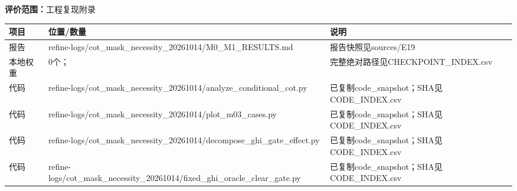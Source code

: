 \documentclass[UTF8,a4paper,landscape,10pt]{ctexart}
\begin{document}
\par
{\small\color{muted}\textbf{评价范围：}工程复现附录}\par\vspace{3mm}
\begin{center}\small
\begin{adjustbox}{max totalheight=0.58\textheight,max width=\linewidth}
\begin{minipage}{\linewidth}\begin{tabularx}{\linewidth}{>{\hsize=0.3500\hsize\raggedright\arraybackslash}X>{\hsize=1.9000\hsize\raggedright\arraybackslash}X>{\hsize=0.7500\hsize\raggedright\arraybackslash}X}\toprule
\textbf{项目} & \textbf{位置/\allowbreak{}数量} & \textbf{说明} \\ \midrule
报告 & refine-logs/\allowbreak{}cot\_\allowbreak{}mask\_\allowbreak{}necessity\_\allowbreak{}20261014/\allowbreak{}M0\_\allowbreak{}M1\_\allowbreak{}RESULTS.md & 报告快照见sources/\allowbreak{}E19 \\
本地权重 & 0个； & 完整绝对路径见CHECKPOINT\_\allowbreak{}INDEX.csv \\
代码 & refine-logs/\allowbreak{}cot\_\allowbreak{}mask\_\allowbreak{}necessity\_\allowbreak{}20261014/\allowbreak{}analyze\_\allowbreak{}conditional\_\allowbreak{}cot.py & 已复制code\_\allowbreak{}snapshot；SHA见CODE\_\allowbreak{}INDEX.csv \\
代码 & refine-logs/\allowbreak{}cot\_\allowbreak{}mask\_\allowbreak{}necessity\_\allowbreak{}20261014/\allowbreak{}plot\_\allowbreak{}m03\_\allowbreak{}cases.py & 已复制code\_\allowbreak{}snapshot；SHA见CODE\_\allowbreak{}INDEX.csv \\
代码 & refine-logs/\allowbreak{}cot\_\allowbreak{}mask\_\allowbreak{}necessity\_\allowbreak{}20261014/\allowbreak{}decompose\_\allowbreak{}ghi\_\allowbreak{}gate\_\allowbreak{}effect.py & 已复制code\_\allowbreak{}snapshot；SHA见CODE\_\allowbreak{}INDEX.csv \\
代码 & refine-logs/\allowbreak{}cot\_\allowbreak{}mask\_\allowbreak{}necessity\_\allowbreak{}20261014/\allowbreak{}fixed\_\allowbreak{}ghi\_\allowbreak{}oracle\_\allowbreak{}clear\_\allowbreak{}gate.py & 已复制code\_\allowbreak{}snapshot；SHA见CODE\_\allowbreak{}INDEX.csv \\
\bottomrule\end{tabularx}\end{minipage}\end{adjustbox}\end{center}
\end{document}

